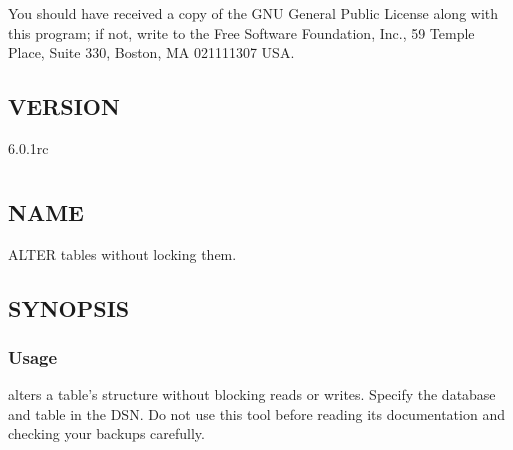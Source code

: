 \documentclass[letterpaper,10pt,english]{sphinxmanual}
\begin{document}
\sphinxAtStartPar
You should have received a copy of the GNU General Public License along with
this program; if not, write to the Free Software Foundation, Inc., 59 Temple
Place, Suite 330, Boston, MA  02111\sphinxhyphen{}1307  USA.


\section{VERSION}
\label{\detokenize{mariadb-query-digest:version}}
\sphinxAtStartPar
{} 6.0.1rc


\chapter{}
\label{\detokenize{mariadb-schema-change:mariadb-schema-change}}\label{\detokenize{mariadb-schema-change::doc}}

\section{NAME}
\label{\detokenize{mariadb-schema-change:name}}
\sphinxAtStartPar
{} \sphinxhyphen{} ALTER tables without locking them.


\section{SYNOPSIS}
\label{\detokenize{mariadb-schema-change:synopsis}}

\subsection{Usage}
\label{\detokenize{mariadb-schema-change:usage}}
\begin{sphinxVerbatim}[commandchars=\\\{\}]
 \PYG{p}{[}\PYG{p}{]} 
\end{sphinxVerbatim}

\sphinxAtStartPar
{} alters a table’s structure without blocking reads or
writes.  Specify the database and table in the DSN. Do not use this tool before
reading its documentation and checking your backups carefully.
\end{document}

